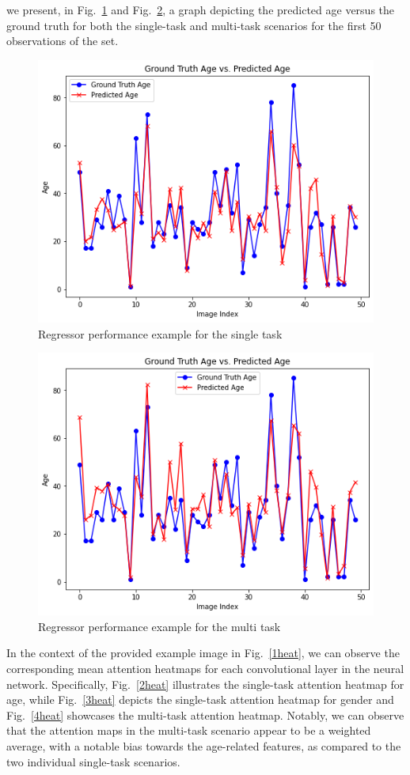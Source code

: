 we present, in Fig.~\ref{8reg} and Fig.~\ref{9reg},
a graph depicting the predicted age versus the ground truth
for both the single-task and multi-task scenarios for the first
50 observations of the set.
\begin{figure}[htbp]
    \centerline{\includegraphics[width=.45\textwidth]{images/testing/reg_single.png}}
    \caption{Regressor performance example for the single task}
    \label{8reg}
\end{figure}
\begin{figure}[htbp]
    \centerline{\includegraphics[width=.45\textwidth]{images/testing/reg_multi.png}}
    \caption{Regressor performance example for the multi task}
    \label{9reg}
\end{figure}

In the context of the provided example image in Fig.~\ref{1heat},
we can observe the corresponding mean attention heatmaps
for each convolutional layer in the neural network.
Specifically, Fig.~\ref{2heat} illustrates the single-task attention
heatmap for age, while Fig.~\ref{3heat} depicts the single-task
attention heatmap for gender and
Fig.~\ref{4heat} showcases the multi-task attention heatmap.
Notably, we can observe that the attention maps in the multi-task
scenario appear to be a weighted average,
with a notable bias towards the age-related features,
as compared to the two individual single-task scenarios.

